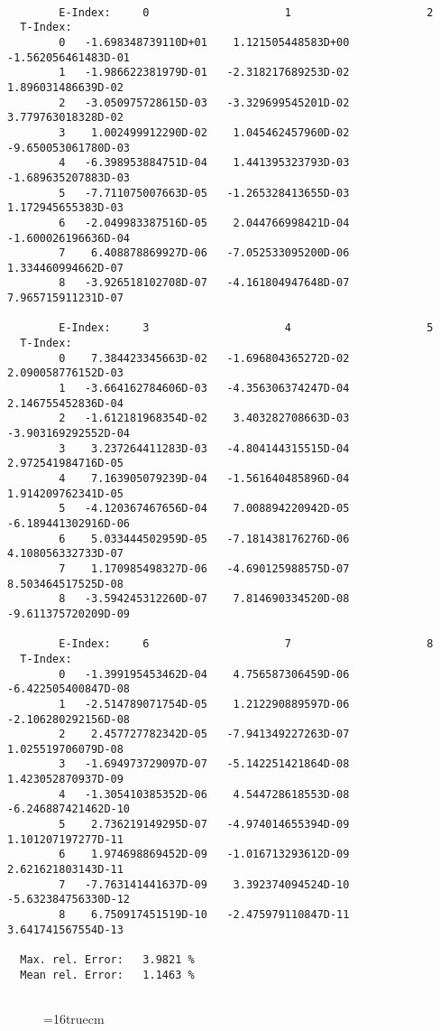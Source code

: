 \documentclass[12pt]{article}
\begin{document}
\begin{small}\begin{verbatim}

        E-Index:     0                     1                     2
  T-Index:
        0   -1.698348739110D+01    1.121505448583D+00   -1.562056461483D-01
        1   -1.986622381979D-01   -2.318217689253D-02    1.896031486639D-02
        2   -3.050975728615D-03   -3.329699545201D-02    3.779763018328D-02
        3    1.002499912290D-02    1.045462457960D-02   -9.650053061780D-03
        4   -6.398953884751D-04    1.441395323793D-03   -1.689635207883D-03
        5   -7.711075007663D-05   -1.265328413655D-03    1.172945655383D-03
        6   -2.049983387516D-05    2.044766998421D-04   -1.600026196636D-04
        7    6.408878869927D-06   -7.052533095200D-06    1.334460994662D-07
        8   -3.926518102708D-07   -4.161804947648D-07    7.965715911231D-07

        E-Index:     3                     4                     5
  T-Index:
        0    7.384423345663D-02   -1.696804365272D-02    2.090058776152D-03
        1   -3.664162784606D-03   -4.356306374247D-04    2.146755452836D-04
        2   -1.612181968354D-02    3.403282708663D-03   -3.903169292552D-04
        3    3.237264411283D-03   -4.804144315515D-04    2.972541984716D-05
        4    7.163905079239D-04   -1.561640485896D-04    1.914209762341D-05
        5   -4.120367467656D-04    7.008894220942D-05   -6.189441302916D-06
        6    5.033444502959D-05   -7.181438176276D-06    4.108056332733D-07
        7    1.170985498327D-06   -4.690125988575D-07    8.503464517525D-08
        8   -3.594245312260D-07    7.814690334520D-08   -9.611375720209D-09

        E-Index:     6                     7                     8
  T-Index:
        0   -1.399195453462D-04    4.756587306459D-06   -6.422505400847D-08
        1   -2.514789071754D-05    1.212290889597D-06   -2.106280292156D-08
        2    2.457727782342D-05   -7.941349227263D-07    1.025519706079D-08
        3   -1.694973729097D-07   -5.142251421864D-08    1.423052870937D-09
        4   -1.305410385352D-06    4.544728618553D-08   -6.246887421462D-10
        5    2.736219149295D-07   -4.974014655394D-09    1.101207197277D-11
        6    1.974698869452D-09   -1.016713293612D-09    2.621621803143D-11
        7   -7.763141441637D-09    3.392374094524D-10   -5.632384756330D-12
        8    6.750917451519D-10   -2.475979110847D-11    3.641741567554D-13

  Max. rel. Error:   3.9821 %
  Mean rel. Error:   1.1463 %


\end{verbatim}\end{small}
\begin{figure} \label{7.2a}
\epsfxsize=16truecm
\end{figure}
\newpage
\end{document}

